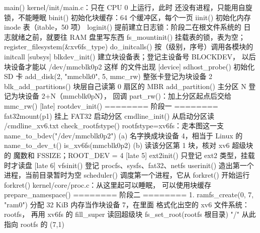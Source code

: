 \begin{txtcode}
main()                                 kernel/init/main.c：只在 CPU 0 上运行，此时
                                       还没有进程，只能用自旋锁，不能睡眠
  binit()                              初始化块缓存：64 个缓冲区，每个一页
  iinit()                              初始化内存 inode 表（itable，50 项）
    loginit()                          提前建立日志锁：阶段二在根文件系统的
                                       日志就绪之前，就要往 RAM 盘里写东西
    fs_mountinit()                     挂载表的锁，表为空；
                                       register_filesystem(&xv6fs_type)
  do_initcalls()                       按（级别，序号）调用各模块的 initcall
    [subsys] blkdev_init()             建立块设备表；登记主设备号 BLOCKDEV，
                                       以后块设备才能以 /dev/mmcblk0p2 这样
                                       的文件出现
    [device] sdhost_probe()            初始化 SD 卡
      add_disk(2, "mmcblk0", 5, mmc_rw)
                                       整张卡登记为块设备 2
        blk_add_partitions()           块层自己读第 0 扇区的 MBR
          add_partition()              主分区 N 登记为块设备 2+N（mmcblk0pN），
                                       回调 part_rw()：加上分区起点后交给 mmc_rw()
    [late]   rootdev_init()            ======== 阶段一 ========
      fat32mount(p1)                   挂上 FAT32 启动分区
      cmdline_init()                   从启动分区读 /cmdline_xv6.txt
      check_rootfstype()               rootfstype=xv6fs：走本图这一支
      name_to_bdev("/dev/mmcblk0p2")
                                  (a)  名字换成块设备 4，相当于 Linux 的
                                       name_to_dev_t()
      is_xv6fs(mmcblk0p2)         (b)  读该分区第 1 块，核对 xv6 超级块的
                                       魔数和 FSSIZE；ROOT_DEV = 4
    [late 5] ext2init()                只登记 ext2 类型，挂载时才读盘
    [late 6] vfsinit()                 登记 procfs、sysfs、fat32、netfs
  userinit()                           造出第一个进程，当前目录暂时为空
  scheduler()                          调度第一个进程，它从 forkret() 开始运行
forkret()                              kernel/core/proc.c：从这里起可以睡眠，
                                       可以使用块缓存
  prepare_namespace()                  ======== 阶段二 ========
    1. ramfs_create(0, 7, "ram0")      分配 32 KiB 内存当作块设备 7，在里面
                                       格式化出空的 xv6 文件系统：rootfs，
                                       再用 xv6fs 的 fill_super 读回超级块
       fs_set_root(rootfs 根目录)      "/" 从此指向 rootfs 的 (7,1)

\end{txtcode}
